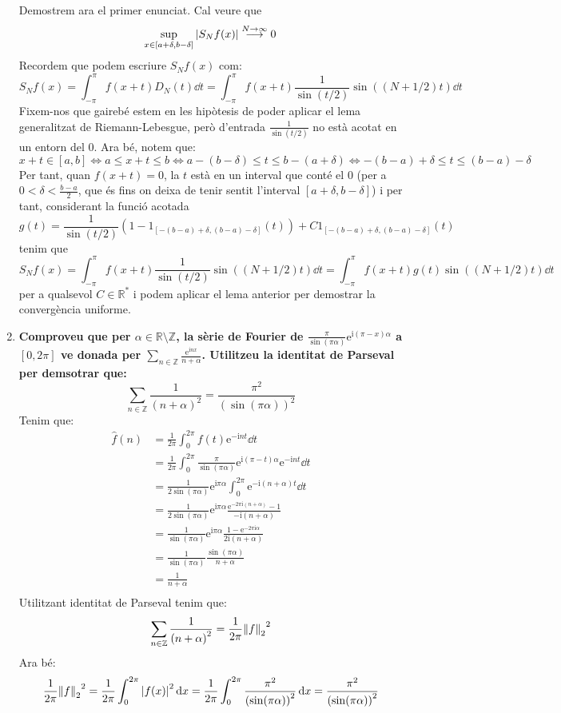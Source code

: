 \documentclass[10pt,a4paper]{article}
\newcommand{\ZZ}{\ensuremath{\mathbb{Z}}} %
\newcommand{\RR}{\ensuremath{\mathbb{R}}} %
\newcommand{\vf}[1]{\boldsymbol{\mathrm{#1}}} %
\newcommand{\ii}{\mathrm{i}} %
\theoremstyle{definition}
\renewcommand{\exp}[1]{\mathrm{e}^{#1}} %
\begin{document}
\begin{enumerate}
        Demostrem ara el primer enunciat. Cal veure que $$\sup_{x\in[a+\delta,b-\delta]}\abs{S_Nf(x)}\overset{N\to\infty}{\longrightarrow}0$$
        Recordem que podem escriure $S_Nf(x)$ com:
        $$S_Nf(x)=\int_{-\pi}^\pi f(x+t)D_N(t)\dd{t}=\int_{-\pi}^\pi f(x+t)\frac{1}{\sin(t/2)}\sin((N+1/2)t)\dd{t}$$
        Fixem-nos que gairebé estem en les hipòtesis de poder aplicar el lema generalitzat de Riemann-Lebesgue, però d'entrada $\frac{1}{\sin(t/2)}$ no està acotat en un entorn del 0. Ara bé, notem que:
        $$x+t\in [a,b]\iff a\leq x+t\leq b\iff a-(b-\delta)\leq t\leq b-(a+\delta)\iff -(b-a)+\delta\leq t\leq(b-a)-\delta$$
        Per tant, quan $f(x+t)=0$, la $t$ està en un interval que conté el 0 (per a $0<\delta<\frac{b-a}{2}$, que és fins on deixa de tenir sentit l'interval $[a+\delta,b-\delta]$) i per tant, considerant la funció acotada $$g(t)=\frac{1}{\sin(t/2)}(1-\vf{1}_{[-(b-a)+\delta,(b-a)-\delta]}(t))+C\vf{1}_{[-(b-a)+\delta,(b-a)-\delta]}(t)$$
        tenim que
        $$S_Nf(x)=\int_{-\pi}^\pi f(x+t)\frac{1}{\sin(t/2)}\sin((N+1/2)t)\dd{t}=\int_{-\pi}^\pi f(x+t)g(t)\sin((N+1/2)t)\dd{t}$$
        per a qualsevol $C\in\RR^*$ i podem aplicar el lema anterior per demostrar la convergència uniforme.
  \item \textbf{Comproveu que per $\alpha\in\RR\setminus\ZZ$, la sèrie de Fourier de $\displaystyle\frac{\pi}{\sin(\pi\alpha)}\exp{\ii(\pi-x)\alpha}$ a $[0,2\pi]$ ve donada per $\sum_{n\in\ZZ}\frac{\exp{\ii nx}}{n+\alpha}$. Utilitzeu la identitat de Parseval per demsotrar que:}
        $$\sum_{n\in\ZZ}\frac{1}{{(n+\alpha)}^2}=\frac{\pi^2}{{(\sin(\pi\alpha))}^2}$$
        Tenim que:
        \begin{align*}
          \widehat{f}(n) & =\frac{1}{2\pi}\int_{0}^{2\pi}f(t)\exp{-\ii n t}\dd{t}                                               \\
                         & =\frac{1}{2\pi}\int_{0}^{2\pi}\frac{\pi}{\sin(\pi\alpha)}\exp{\ii (\pi-t)\alpha}\exp{-\ii n t}\dd{t} \\
                         & =\frac{1}{2\sin(\pi\alpha)}\exp{\ii\pi\alpha}\int_{0}^{2\pi}\exp{-\ii (n+\alpha) t}\dd{t}            \\
                         & =\frac{1}{2\sin(\pi\alpha)}\exp{\ii\pi\alpha}\frac{\exp{-2\pi\ii(n+\alpha)}-1}{-\ii(n+\alpha)}       \\
                         & =\frac{1}{\sin(\pi\alpha)}\exp{\ii\pi\alpha}\frac{1-\exp{-2\pi\ii\alpha}}{2\ii(n+\alpha)}            \\
                         & =\frac{1}{\sin(\pi\alpha)}\frac{\sin(\pi\alpha)}{n+\alpha}                                           \\
                         & =\frac{1}{n+\alpha}                                                                                  \\
        \end{align*}
        Utilitzant identitat de Parseval tenim que:
        $$\sum_{n\in\ZZ}\frac{1}{{(n+\alpha)}^2}=\frac{1}{2\pi}{\norm{f}_2}^2$$
        Ara bé: $$\frac{1}{2\pi}{\norm{f}_2}^2=\frac{1}{2\pi}\int_0^{2\pi}\abs{f(x)}^2\dd{x}=\frac{1}{2\pi}\int_0^{2\pi}\frac{\pi^2}{{(\sin(\pi\alpha))}^2}\dd{x}=\frac{\pi^2}{{(\sin(\pi\alpha))}^2}$$
\end{enumerate}
\end{document}
